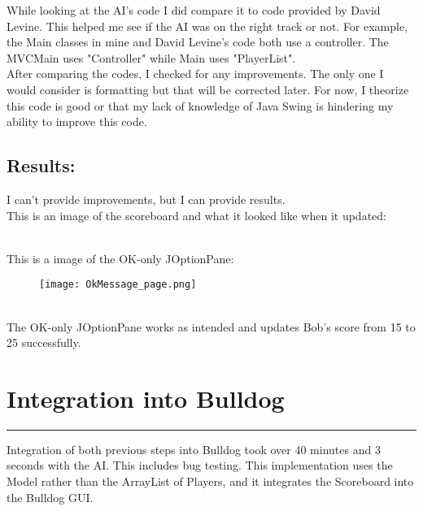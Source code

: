 \documentclass[a4paper,11pt]{article}
\begin{document}
While looking at the AI's code I did compare it to code provided by David Levine. This helped me see if the AI was on the right track or not. For example, the Main classes in mine and David Levine's code both use a controller. The MVCMain uses "Controller" while Main uses "PlayerList".\\
After comparing the codes, I checked for any improvements. The only one I would consider is formatting but that will be corrected later. For now, I theorize this code is good or that my lack of knowledge of Java Swing is hindering my ability to improve this code. 
\subsection*{Results:}
I can't provide improvements, but I can provide results.\\
This is an image of the scoreboard and what it looked like when it updated:
\begin{figure}[h]
    \centering
    \label{fig:comparison}
\end{figure} \\
This is a image of the OK-only JOptionPane:
\begin{figure}[h] 
    \centering
    \texttt{[image: OkMessage\_page.png]}
    \label{fig:first}
\end{figure}\\
The OK-only JOptionPane works as intended and updates Bob's score from 15 to 25 successfully. 
\section*{Integration into Bulldog}
\hrule
\vspace{10pt} %
Integration of both previous steps into Bulldog took over 40 minutes and 3 seconds with the AI. This includes bug testing. This implementation uses the Model rather than the ArrayList of Players, and it integrates the Scoreboard into the Bulldog GUI. 
\vspace{5pt} %
\end{document}
